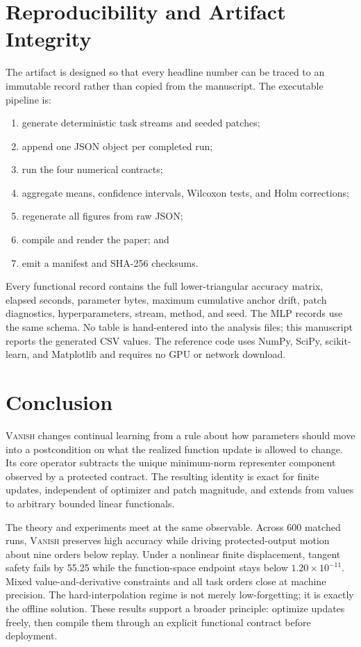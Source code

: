 \documentclass{vanish_ieee}
\theoremstyle{definition}
\newcommand{\VANISH}{\textsc{Vanish}}
\begin{document}
\section{Reproducibility and Artifact Integrity}

The artifact is designed so that every headline number can be traced to an immutable record rather than copied from the manuscript.  The executable pipeline is:
\begin{enumerate}
  \item generate deterministic task streams and seeded patches;
  \item append one JSON object per completed run;
  \item run the four numerical contracts;
  \item aggregate means, confidence intervals, Wilcoxon tests, and Holm corrections;
  \item regenerate all figures from raw JSON;
  \item compile and render the paper; and
  \item emit a manifest and SHA-256 checksums.
\end{enumerate}
Every functional record contains the full lower-triangular accuracy matrix, elapsed seconds, parameter bytes, maximum cumulative anchor drift, patch diagnostics, hyperparameters, stream, method, and seed.  The MLP records use the same schema.  No table is hand-entered into the analysis files; this manuscript reports the generated CSV values.  The reference code uses NumPy, SciPy, scikit-learn, and Matplotlib and requires no GPU or network download.

\section{Conclusion}

\VANISH{} changes continual learning from a rule about how parameters should move into a postcondition on what the realized function update is allowed to change.  Its core operator subtracts the unique minimum-norm representer component observed by a protected contract.  The resulting identity is exact for finite updates, independent of optimizer and patch magnitude, and extends from values to arbitrary bounded linear functionals.

The theory and experiments meet at the same observable.  Across 600 matched runs, \VANISH{} preserves high accuracy while driving protected-output motion about nine orders below replay.  Under a nonlinear finite displacement, tangent safety fails by 55.25 while the function-space endpoint stays below $1.20\times10^{-11}$.  Mixed value-and-derivative constraints and all task orders close at machine precision.  The hard-interpolation regime is not merely low-forgetting; it is exactly the offline solution.  These results support a broader principle: optimize updates freely, then compile them through an explicit functional contract before deployment.
\end{document}
